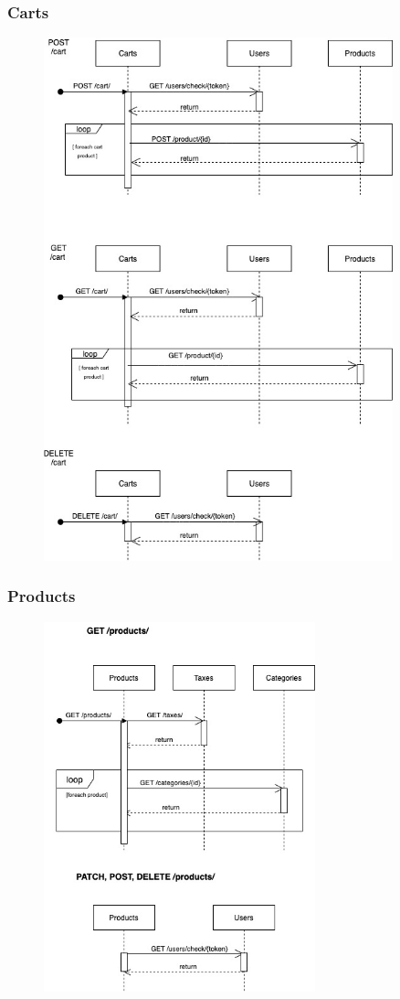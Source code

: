 \subsubsection{Carts}
\begin{figure}[H]
    \includegraphics[width=0.9\textwidth]{res/images/sequence-diagrams/carts.jpg}
\end{figure}

\subsubsection{Products}
\begin{figure}[H]
    \includegraphics[width=0.7\textwidth]{res/images/sequence-diagrams/products.jpg}
\end{figure}